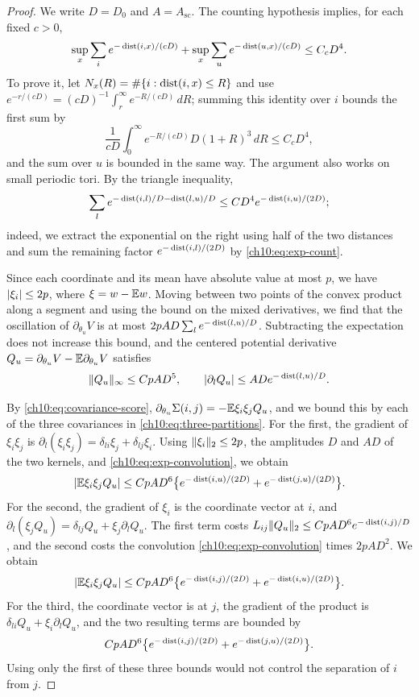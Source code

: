 \begin{proof}
We write $D=D_0$ and $A=A_{\mathrm{sc}}$. The counting hypothesis implies, for each fixed $c>0$,
\begin{equation}\label{ch10:eq:exp-count}
 \sup_x\sum_ie^{-\operatorname{dist}(i,x)/(cD)}+\sup_x\sum_ue^{-\operatorname{dist}(u,x)/(cD)}\le C_cD^4.
\end{equation}
To prove it, let $N_x(R)=\#\{i:\operatorname{dist}(i,x)\le R\}$ and use $e^{-r/(cD)}=(cD)^{-1}\int_r^\infty e^{-R/(cD)}\,dR$; summing this identity over $i$ bounds the first sum by
\[
 \frac1{cD}\int_0^\infty e^{-R/(cD)}D(1+R)^3\,dR\le C_cD^4,
\]
and the sum over $u$ is bounded in the same way. The argument also works on small periodic tori. By the triangle inequality,
\begin{equation}\label{ch10:eq:exp-convolution}
 \sum_le^{-\operatorname{dist}(i,l)/D-\operatorname{dist}(l,u)/D}\le CD^4e^{-\operatorname{dist}(i,u)/(2D)};
\end{equation}
indeed, we extract the exponential on the right using half of the two distances and sum the remaining factor $e^{-\operatorname{dist}(i,l)/(2D)}$ by \eqref{ch10:eq:exp-count}.

Since each coordinate and its mean have absolute value at most $p$, we have $\lvert \xi_i\rvert\le2p$, where $\xi=w-\mathbb E w$. Moving between two points of the convex product along a segment and using the bound on the mixed derivatives, we find that the oscillation of $\partial_{\theta_u}V$ is at most $2pAD\sum_le^{-\operatorname{dist}(l,u)/D}$. Subtracting the expectation does not increase this bound, and the centered potential derivative $Q_u=\partial_{\theta_u}V-\mathbb E\partial_{\theta_u}V$ satisfies
\begin{equation}\label{ch10:eq:score-oscillation}
 \lVert Q_u\rVert_\infty\le CpAD^5,\qquad \lvert \partial_lQ_u\rvert\le ADe^{-\operatorname{dist}(l,u)/D}.
\end{equation}

By \eqref{ch10:eq:covariance-score}, $\partial_{\theta_u}\Sigma(i,j)=-\mathbb E\xi_i\xi_jQ_u$, and we bound this by each of the three covariances in \eqref{ch10:eq:three-partitions}. For the first, the gradient of $\xi_i\xi_j$ is $\partial_l(\xi_i\xi_j)=\delta_{li}\xi_j+\delta_{lj}\xi_i$. Using $\lVert \xi_i\rVert_2\le2p$, the amplitudes $D$ and $AD$ of the two kernels, and \eqref{ch10:eq:exp-convolution}, we obtain
\[
 \lvert \mathbb E\xi_i\xi_jQ_u\rvert\le CpAD^6\bigl\{e^{-\operatorname{dist}(i,u)/(2D)}+e^{-\operatorname{dist}(j,u)/(2D)}\bigr\}.
\]
For the second, the gradient of $\xi_i$ is the coordinate vector at $i$, and $\partial_l(\xi_jQ_u)=\delta_{lj}Q_u+\xi_j\partial_lQ_u$. The first term costs $L_{ij}\lVert Q_u\rVert_2\le CpAD^6e^{-\operatorname{dist}(i,j)/D}$, and the second costs the convolution \eqref{ch10:eq:exp-convolution} times $2pAD^2$. We obtain
\[
 \lvert \mathbb E\xi_i\xi_jQ_u\rvert\le CpAD^6\bigl\{e^{-\operatorname{dist}(i,j)/(2D)}+e^{-\operatorname{dist}(i,u)/(2D)}\bigr\}.
\]
For the third, the coordinate vector is at $j$, the gradient of the product is $\delta_{li}Q_u+\xi_i\partial_lQ_u$, and the two resulting terms are bounded by
\[
 CpAD^6\bigl\{e^{-\operatorname{dist}(i,j)/(2D)}+e^{-\operatorname{dist}(j,u)/(2D)}\bigr\}.
\]
Using only the first of these three bounds would not control the separation of $i$ from $j$.


\end{proof}
